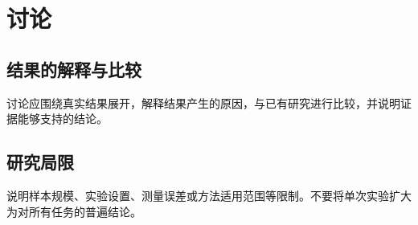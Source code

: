 \section{讨论}
\subsection{结果的解释与比较}
讨论应围绕真实结果展开，解释结果产生的原因，与已有研究进行比较，并说明证据能够支持的结论。
\subsection{研究局限}
说明样本规模、实验设置、测量误差或方法适用范围等限制。不要将单次实验扩大为对所有任务的普遍结论。
